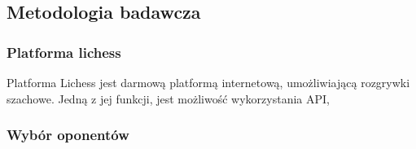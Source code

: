 \subsection{Metodologia badawcza}
\label{subsec:metodologia-badawcza}

\subsubsection{Platforma lichess}
Platforma Lichess jest darmową platformą internetową, umożliwiającą rozgrywki szachowe.
Jedną z jej funkcji, jest możliwość wykorzystania API,
\subsubsection{Wybór oponentów}